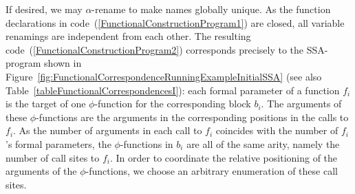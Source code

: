 If desired, we may $\alpha$-rename to make names globally unique. As
the function declarations in
code~(\ref{FunctionalConstructionProgram1}) are closed, all variable
renamings are independent from each other. The resulting
code~(\ref{FunctionalConstructionProgram2}) corresponds precisely to
the SSA-program shown in
Figure~\ref{fig:FunctionalCorrespondenceRunningExampleInitialSSA} (see
also Table~\ref{tableFunctionalCorrespondencesI}): each formal
parameter of a function $f_i$ is the target of one $\phi$-function for
the corresponding block $b_i$. The arguments of these $\phi$-functions
are the arguments in the corresponding positions in the calls to
$f_i$. As the number of arguments in each call to $f_i$ coincides with
the number of $f_i$'s formal parameters, the $\phi$-functions in $b_i$
are all of the same arity, namely the number of call sites to $f_i$.
In order to coordinate the relative positioning of the arguments of
the $\phi$-functions, we choose an arbitrary enumeration of these call
sites.
